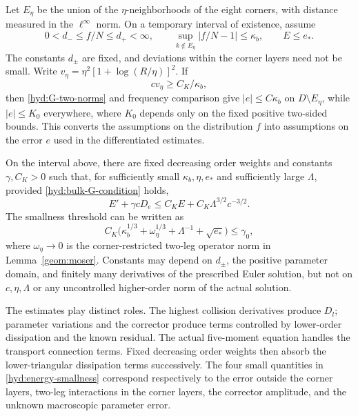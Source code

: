 Let $E_\eta$ be the union of the $\eta$-neighborhoods of the eight corners,
with distance measured in the $\ell^\infty$ norm. On a temporary interval
of existence, assume
\begin{equation}\label{hyd:bootstrap-assumptions}
 0<d_-\le f/N\le d_+<\infty,
 \qquad \sup_{k\notin E_\eta}|f/N-1|\le\kappa_b,
 \qquad E\le e_*.
\end{equation}
The constants $d_\pm$ are fixed, and deviations within the corner layers
need not be small. Write $v_\eta=\eta^2[1+\log(R/\eta)]^2$. If
\begin{equation}\label{hyd:bulk-G-condition}
 c v_\eta\ge C_K/\kappa_b,
\end{equation}
then \eqref{hyd:G-two-norms} and frequency comparison give
$|e|\le C\kappa_b$ on $D\setminus E_\eta$, while $|e|\le K_0$ everywhere,
where $K_0$ depends only on the fixed positive two-sided bounds. This
converts the assumptions on the distribution $f$ into assumptions on
the error $e$ used in the differentiated estimates.

\begin{proposition}\label{hyd:energy}
 On the interval above, there are fixed decreasing order weights and
 constants $\gamma,C_K>0$ such that, for sufficiently small
 $\kappa_b,\eta,e_*$ and sufficiently large $\Lambda$, provided
 \eqref{hyd:bulk-G-condition} holds,
 \begin{equation}\label{hyd:energy-differential}
 E'+\gamma cD_e\le C_KE+C_K\Lambda^{3/2}c^{-3/2}.
 \end{equation}
 The smallness threshold can be written as
 \begin{equation}\label{hyd:energy-smallness}
 C_K\bigl(\kappa_b^{1/3}+\omega_\eta^{1/3}
                      +\Lambda^{-1}+\sqrt{e_*}\bigr)\le\gamma_0,
 \end{equation}
 where $\omega_\eta\to0$ is the corner-restricted two-leg operator norm
 in Lemma~\ref{geom:moser}. Constants may depend on $d_\pm$, the positive
 parameter domain, and finitely many derivatives of the prescribed
 Euler solution, but not on $c,\eta,\Lambda$ or any uncontrolled
 higher-order norm of the actual solution.
\end{proposition}

The estimates play distinct roles. The highest collision derivatives
produce $D_l$; parameter variations and the corrector produce terms
controlled by lower-order dissipation and the known residual. The
actual five-moment equation handles the transport connection terms.
Fixed decreasing order weights then absorb the lower-triangular
dissipation terms successively. The four small quantities in
\eqref{hyd:energy-smallness} correspond respectively to the error outside
the corner layers, two-leg interactions in the corner layers, the
corrector amplitude, and the unknown macroscopic parameter error.

